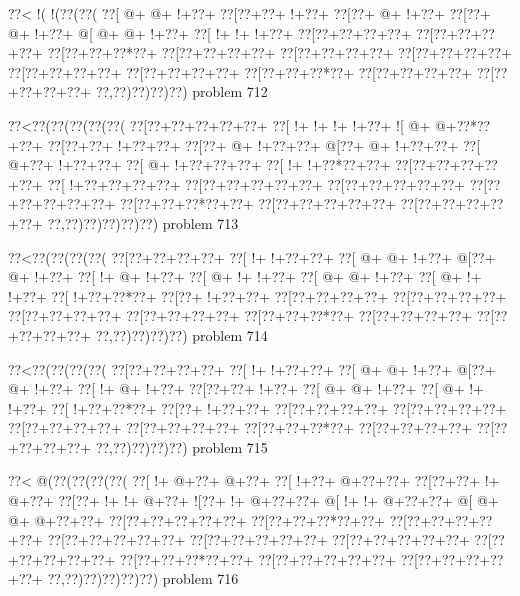 \vbox{\vbox{\goo
\0??<\- !(\- !(\0??(\0??(
\0??[\- @+\- @+\- !+\0??+
\0??[\0??+\0??+\- !+\0??+
\0??[\0??+\- @+\- !+\0??+
\0??[\0??+\- @+\- !+\0??+
\- @[\- @+\- @+\- !+\0??+
\0??[\- !+\- !+\- !+\0??+
\0??[\0??+\0??+\0??+\0??+
\0??[\0??+\0??+\0??+\0??+
\0??[\0??+\0??+\0??*\0??+
\0??[\0??+\0??+\0??+\0??+
\0??[\0??+\0??+\0??+\0??+
\0??[\0??+\0??+\0??+\0??+
\0??[\0??+\0??+\0??+\0??+
\0??[\0??+\0??+\0??+\0??+
\0??[\0??+\0??+\0??*\0??+
\0??[\0??+\0??+\0??+\0??+
\0??[\0??+\0??+\0??+\0??+
\0??,\0??)\0??)\0??)\0??)
}
\hfil problem 712\hfil\break
}

\vbox{\vbox{\goo
\0??<\0??(\0??(\0??(\0??(\0??(
\0??[\0??+\0??+\0??+\0??+\0??+
\0??[\- !+\- !+\- !+\- !+\0??+
\- ![\- @+\- @+\0??*\0??+\0??+
\0??[\0??+\0??+\- !+\0??+\0??+
\0??[\0??+\- @+\- !+\0??+\0??+
\- @[\0??+\- @+\- !+\0??+\0??+
\0??[\- @+\0??+\- !+\0??+\0??+
\0??[\- @+\- !+\0??+\0??+\0??+
\0??[\- !+\- !+\0??*\0??+\0??+
\0??[\0??+\0??+\0??+\0??+\0??+
\0??[\- !+\0??+\0??+\0??+\0??+
\0??[\0??+\0??+\0??+\0??+\0??+
\0??[\0??+\0??+\0??+\0??+\0??+
\0??[\0??+\0??+\0??+\0??+\0??+
\0??[\0??+\0??+\0??*\0??+\0??+
\0??[\0??+\0??+\0??+\0??+\0??+
\0??[\0??+\0??+\0??+\0??+\0??+
\0??,\0??)\0??)\0??)\0??)\0??)
}
\hfil problem 713\hfil\break
}

\vbox{\vbox{\goo
\0??<\0??(\0??(\0??(\0??(
\0??[\0??+\0??+\0??+\0??+
\0??[\- !+\- !+\0??+\0??+
\0??[\- @+\- @+\- !+\0??+
\- @[\0??+\- @+\- !+\0??+
\0??[\- !+\- @+\- !+\0??+
\0??[\- @+\- !+\- !+\0??+
\0??[\- @+\- @+\- !+\0??+
\0??[\- @+\- !+\- !+\0??+
\0??[\- !+\0??+\0??*\0??+
\0??[\0??+\- !+\0??+\0??+
\0??[\0??+\0??+\0??+\0??+
\0??[\0??+\0??+\0??+\0??+
\0??[\0??+\0??+\0??+\0??+
\0??[\0??+\0??+\0??+\0??+
\0??[\0??+\0??+\0??*\0??+
\0??[\0??+\0??+\0??+\0??+
\0??[\0??+\0??+\0??+\0??+
\0??,\0??)\0??)\0??)\0??)
}
\hfil problem 714\hfil\break
}

\vbox{\vbox{\goo
\0??<\0??(\0??(\0??(\0??(
\0??[\0??+\0??+\0??+\0??+
\0??[\- !+\- !+\0??+\0??+
\0??[\- @+\- @+\- !+\0??+
\- @[\0??+\- @+\- !+\0??+
\0??[\- !+\- @+\- !+\0??+
\0??[\0??+\0??+\- !+\0??+
\0??[\- @+\- @+\- !+\0??+
\0??[\- @+\- !+\- !+\0??+
\0??[\- !+\0??+\0??*\0??+
\0??[\0??+\- !+\0??+\0??+
\0??[\0??+\0??+\0??+\0??+
\0??[\0??+\0??+\0??+\0??+
\0??[\0??+\0??+\0??+\0??+
\0??[\0??+\0??+\0??+\0??+
\0??[\0??+\0??+\0??*\0??+
\0??[\0??+\0??+\0??+\0??+
\0??[\0??+\0??+\0??+\0??+
\0??,\0??)\0??)\0??)\0??)
}
\hfil problem 715\hfil\break
}

\vbox{\vbox{\goo
\0??<\- @(\0??(\0??(\0??(\0??(
\0??[\- !+\- @+\0??+\- @+\0??+
\0??[\- !+\0??+\- @+\0??+\0??+
\0??[\0??+\0??+\- !+\- @+\0??+
\0??[\0??+\- !+\- !+\- @+\0??+
\- ![\0??+\- !+\- @+\0??+\0??+
\- @[\- !+\- !+\- @+\0??+\0??+
\- @[\- @+\- @+\- @+\0??+\0??+
\0??[\0??+\0??+\0??+\0??+\0??+
\0??[\0??+\0??+\0??*\0??+\0??+
\0??[\0??+\0??+\0??+\0??+\0??+
\0??[\0??+\0??+\0??+\0??+\0??+
\0??[\0??+\0??+\0??+\0??+\0??+
\0??[\0??+\0??+\0??+\0??+\0??+
\0??[\0??+\0??+\0??+\0??+\0??+
\0??[\0??+\0??+\0??*\0??+\0??+
\0??[\0??+\0??+\0??+\0??+\0??+
\0??[\0??+\0??+\0??+\0??+\0??+
\0??,\0??)\0??)\0??)\0??)\0??)
}
\hfil problem 716\hfil\break
}

